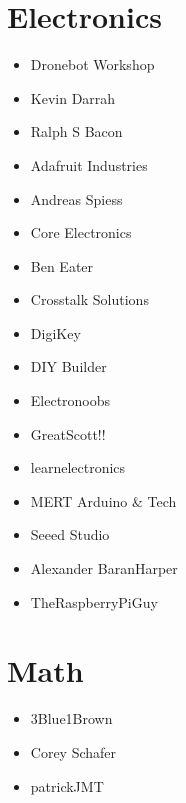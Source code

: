 \documentclass[letterpaper,10pt,english,openany,oneside]{sphinxmanual}
\begin{document}
\section{Electronics}
\label{\detokenize{youtube:electronics}}\begin{itemize}
\item {} 
\sphinxAtStartPar
Dronebot Workshop

\item {} 
\sphinxAtStartPar
Kevin Darrah

\item {} 
\sphinxAtStartPar
Ralph S Bacon

\item {} 
\sphinxAtStartPar
Adafruit Industries

\item {} 
\sphinxAtStartPar
Andreas Spiess

\item {} 
\sphinxAtStartPar
Core Electronics

\item {} 
\sphinxAtStartPar
Ben Eater

\item {} 
\sphinxAtStartPar
Crosstalk Solutions

\item {} 
\sphinxAtStartPar
Digi\sphinxhyphen{}Key

\item {} 
\sphinxAtStartPar
DIY Builder

\item {} 
\sphinxAtStartPar
Electronoobs

\item {} 
\sphinxAtStartPar
GreatScott!!

\item {} 
\sphinxAtStartPar
learnelectronics

\item {} 
\sphinxAtStartPar
MERT Arduino \& Tech

\item {} 
\sphinxAtStartPar
Seeed Studio

\item {} 
\sphinxAtStartPar
Alexander Baran\sphinxhyphen{}Harper

\item {} 
\sphinxAtStartPar
TheRaspberryPiGuy

\end{itemize}


\section{Math}
\label{\detokenize{youtube:math}}\begin{itemize}
\item {} 
\sphinxAtStartPar
3Blue1Brown

\item {} 
\sphinxAtStartPar
Corey Schafer

\item {} 
\sphinxAtStartPar
patrickJMT

\end{itemize}
\end{document}
